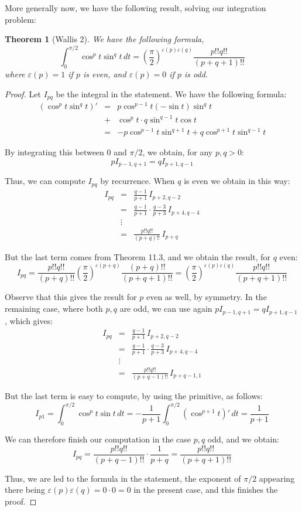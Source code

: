 \documentclass[12pt]{amsbook}
\newtheorem{theorem}{Theorem}[chapter]
\begin{document}
More generally now, we have the following result, solving our integration problem:


\begin{theorem}[Wallis 2]
We have the following formula,
$$\int_0^{\pi/2}\cos^pt\sin^qt\,dt=\left(\frac{\pi}{2}\right)^{\varepsilon(p)\varepsilon(q)}\frac{p!!q!!}{(p+q+1)!!}$$
where $\varepsilon(p)=1$ if $p$ is even, and $\varepsilon(p)=0$ if $p$ is odd.
\end{theorem}

\begin{proof}
Let $I_{pq}$ be the integral in the statement. We have the following formula:
\begin{eqnarray*}
(\cos^pt\sin^qt)'
&=&p\cos^{p-1}t(-\sin t)\sin^qt\\
&+&\cos^pt\cdot q\sin^{q-1}t\cos t\\
&=&-p\cos^{p-1}t\sin^{q+1}t+q\cos^{p+1}t\sin^{q-1}t
\end{eqnarray*}

By integrating this between $0$ and $\pi/2$, we obtain, for any $p,q>0$:
$$pI_{p-1,q+1}=qI_{p+1,q-1}$$

Thus, we can compute $I_{pq}$ by recurrence. When $q$ is even we obtain in this way:
\begin{eqnarray*}
I_{pq}
&=&\frac{q-1}{p+1}\,I_{p+2,q-2}\\
&=&\frac{q-1}{p+1}\cdot\frac{q-3}{p+3}\,I_{p+4,q-4}\\
&\vdots&\\
&=&\frac{p!!q!!}{(p+q)!!}\,I_{p+q}
\end{eqnarray*}

But the last term comes from Theorem 11.3, and we obtain the result, for $q$ even:
$$I_{pq}
=\frac{p!!q!!}{(p+q)!!}\left(\frac{\pi}{2}\right)^{\varepsilon(p+q)}\frac{(p+q)!!}{(p+q+1)!!}
=\left(\frac{\pi}{2}\right)^{\varepsilon(p)\varepsilon(q)}\frac{p!!q!!}{(p+q+1)!!}$$

Observe that this gives the result for $p$ even as well, by symmetry. In the remaining case, where both $p,q$ are odd, we can use again $pI_{p-1,q+1}=qI_{p+1,q-1}$, which gives:
\begin{eqnarray*}
I_{pq}
&=&\frac{q-1}{p+1}\,I_{p+2,q-2}\\
&=&\frac{q-1}{p+1}\cdot\frac{q-3}{p+3}\,I_{p+4,q-4}\\
&\vdots&\\
&=&\frac{p!!q!!}{(p+q-1)!!}\,I_{p+q-1,1}
\end{eqnarray*}

But the last term is easy to compute, by using the primitive, as follows:
$$I_{p1}
=\int_0^{\pi/2}\cos^pt\sin t\,dt
=-\frac{1}{p+1}\int_0^{\pi/2}(\cos^{p+1}t)'\,dt
=\frac{1}{p+1}$$

We can therefore finish our computation in the case $p,q$ odd, and we obtain:
$$I_{pq}
=\frac{p!!q!!}{(p+q-1)!!}\cdot\frac{1}{p+q}
=\frac{p!!q!!}{(p+q+1)!!}$$

Thus, we are led to the formula in the statement, the exponent of $\pi/2$ appearing there being $\varepsilon(p)\varepsilon(q)=0\cdot 0=0$ in the present case, and this finishes the proof.
\end{proof}
\end{document}
